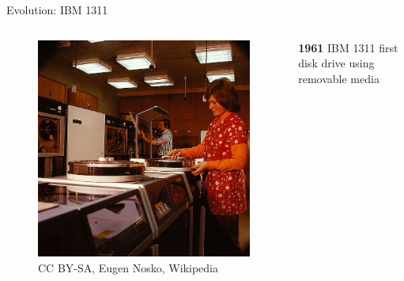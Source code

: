 \documentclass[12pt]{beamer}
\begin{document}
\begin{frame}[fragile]{Evolution: IBM 1311}
	\begin{columns}[c]
	\begin{column}[c]{.5\textwidth}	
 		\begin{figure}[c]
	 		\centering
	 		\includegraphics[width=\linewidth]{img/ibm_1311.jpg}
	 			\caption{CC BY-SA, Eugen Nosko, Wikipedia}
 		\end{figure}
 	\end{column}
 	
	\begin{column}[c]{.5\textwidth}
		\textbf{1961} IBM 1311 first disk drive using removable media
	\end{column}
	\end{columns}
\end{frame}
\end{document}
